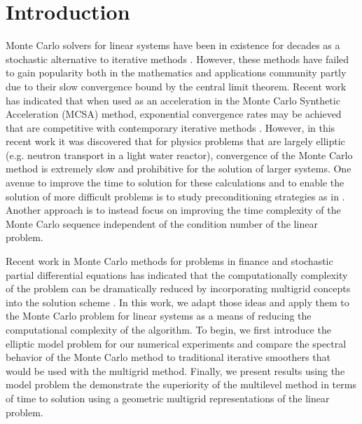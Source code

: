 \documentclass[note]{TechNote}
\begin{document}
\section{Introduction}
\label{sec:introduction}
Monte Carlo solvers for linear systems have been in existence for
decades as a stochastic alternative to iterative methods
\cite{forsythe_matrix_1950,wasow_note_1952,halton_sequential_1962,hammersley_monte_1964,spanier_monte_1969}. However,
these methods have failed to gain popularity both in the mathematics
and applications community partly due to their slow convergence bound
by the central limit theorem. Recent work has indicated that when used
as an acceleration in the Monte Carlo Synthetic Acceleration (MCSA)
method, exponential convergence rates may be achieved that are
competitive with contemporary iterative methods
\cite{evans_residual_2003,evans_monte_2009,evans_monte_2012,slattery_phd_2013}.
However, in this recent work it was discovered that for physics
problems that are largely elliptic (e.g. neutron transport in a light
water reactor), convergence of the Monte Carlo method is extremely
slow and prohibitive for the solution of larger systems. One avenue to
improve the time to solution for these calculations and to enable the
solution of more difficult problems is to study preconditioning
strategies as in \cite{slattery_phd_2013}. Another approach is to
instead focus on improving the time complexity of the Monte Carlo
sequence independent of the condition number of the linear problem.

Recent work in Monte Carlo methods for problems in finance and
stochastic partial differential equations has indicated that the
computationally complexity of the problem can be dramatically reduced
by incorporating multigrid concepts into the solution scheme
\cite{heinrich_2001,giles_2008,cliffe_2011}. In this work, we adapt
those ideas and apply them to the Monte Carlo problem for linear
systems as a means of reducing the computational complexity of the
algorithm. To begin, we first introduce the elliptic model problem for
our numerical experiments and compare the spectral behavior of the
Monte Carlo method to traditional iterative smoothers that would be
used with the multigrid method. Finally, we present results using the
model problem the demonstrate the superiority of the multilevel method
in terms of time to solution using a geometric multigrid
representations of the linear problem.

\end{document}
